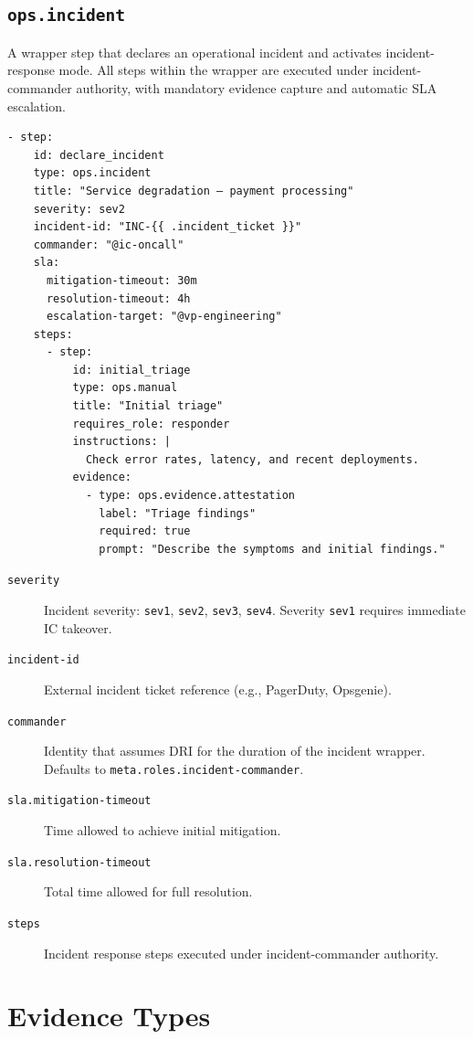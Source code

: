 \subsection{\texttt{ops.incident}}

A wrapper step that declares an operational incident and activates incident-response mode.
All steps within the wrapper are executed under incident-commander authority, with mandatory
evidence capture and automatic SLA escalation.

\begin{verbatim}
- step:
    id: declare_incident
    type: ops.incident
    title: "Service degradation — payment processing"
    severity: sev2
    incident-id: "INC-{{ .incident_ticket }}"
    commander: "@ic-oncall"
    sla:
      mitigation-timeout: 30m
      resolution-timeout: 4h
      escalation-target: "@vp-engineering"
    steps:
      - step:
          id: initial_triage
          type: ops.manual
          title: "Initial triage"
          requires_role: responder
          instructions: |
            Check error rates, latency, and recent deployments.
          evidence:
            - type: ops.evidence.attestation
              label: "Triage findings"
              required: true
              prompt: "Describe the symptoms and initial findings."
\end{verbatim}

\begin{description}
  \item[\texttt{severity}] Incident severity: \texttt{sev1}, \texttt{sev2}, \texttt{sev3},
    \texttt{sev4}. Severity \texttt{sev1} requires immediate IC takeover.
  \item[\texttt{incident-id}] External incident ticket reference (e.g., PagerDuty, Opsgenie).
  \item[\texttt{commander}] Identity that assumes DRI for the duration of the incident wrapper.
    Defaults to \texttt{meta.roles.incident-commander}.
  \item[\texttt{sla.mitigation-timeout}] Time allowed to achieve initial mitigation.
  \item[\texttt{sla.resolution-timeout}] Total time allowed for full resolution.
  \item[\texttt{steps}] Incident response steps executed under incident-commander authority.
\end{description}

\section{Evidence Types}
\label{sec:schema-evidence}

